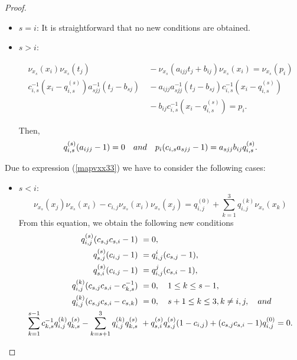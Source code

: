 \documentclass{amsart}
\theoremstyle{definition}
\theoremstyle{remark}
\numberwithin{equation}{section}
\begin{document}
\begin{proof}
\begin{itemize}
   In this way, 
    \begin{align*}
        b_{sj}(a_{ijj}-1) &\ =b_{ij}(a_{sjj}-1), \\
        q_{s,i}^{(s)}(a_{ijj}-1) &\ =0, \quad {\rm and} \\
        p_i(c_{s,i}-a_{sjj}) &\ =b_{ij}q_{s,i}^{(s)}.
    \end{align*}
    
    \item $s = i$: It is straightforward that no new conditions are obtained.
    
    \item $s > i$: 

    \begin{align*}
          \nu_{x_s}(x_i)\nu_{x_s}(t_j) &\ - \nu_{x_s}(a_{ijj}t_j+b_{ij})\nu_{x_s}(x_i) = \nu_{x_s}(p_i) \\
           c_{i,s}^{-1}(x_i-q_{i,s}^{(s)})a_{sjj}^{-1}(t_j-b_{sj}) &\ -a_{ijj}a_{sjj}^{-1}(t_j-b_{sj})c_{i,s}^{-1}(x_i-q_{i,s}^{(s)}) \\
           &\ - b_{ij}c_{i,s}^{-1}(x_i-q_{i,s}^{(s)}) = p_i.
    \end{align*}
  
Then, 
\[
q_{i,s}^{(s)}(a_{ijj}-1) = 0 \quad {\rm and} \quad p_i(c_{i,s}a_{sjj}-1) = a_{sjj}b_{ij}q_{i,s}^{(s)}. 
\]
\end{itemize}

Due to expression {\rm (}\ref{mapvxx33}{\rm )} we have to consider the following cases:
\begin{itemize}
    \item $s < i$:
    \begin{equation*}
        \nu_{x_s}(x_j)\nu_{x_s}(x_i)-c_{i,j}\nu_{x_s}(x_i)\nu_{x_s}(x_j) = q_{i,j}^{(0)}+\sum_{k=1}^{3}q_{i,j}^{(k)}\nu_{x_s}(x_k)
    \end{equation*}
    From this equation, we obtain the following new conditions
    \begin{align*}
        q_{i,j}^{(s)}(c_{s,j}c_{s,i}-1) &\ =0, \\
        q_{s,j}^{(s)}(c_{i,j}-1) &\ = q_{i,j}^{i}(c_{s,j}-1), \\
        q_{s,i}^{(s)}(c_{i,j}-1) &\ = q_{i,j}^{j}(c_{s,i}-1), \\
        q_{i,j}^{(k)}(c_{s,j}c_{s,i}-c_{k,s}^{-1}) &\ =0, \quad 1\leq k \leq s-1, \\
        q_{i,j}^{(k)}(c_{s,j}c_{s,i}-c_{s,k}) &\ =0, \quad s+1\leq k \leq 3, k\ne i, j, \quad {\rm and}  \\
        \sum_{k=1}^{s-1}c_{k,s}^{-1}q_{i,j}^{(k)}q_{k,s}^{(s)}-\sum_{k=s+1}^{3}q_{i,j}^{(k)}q_{k,s}^{(s)} &\ +q_{s,i}^{(s)}q_{s,j}^{(s)}(1-c_{i,j})+(c_{s,j}c_{s,i}-1)q_{i,j}^{(0)}  = 0.
    \end{align*}
    

\end{itemize}
\end{proof}
\end{document}
